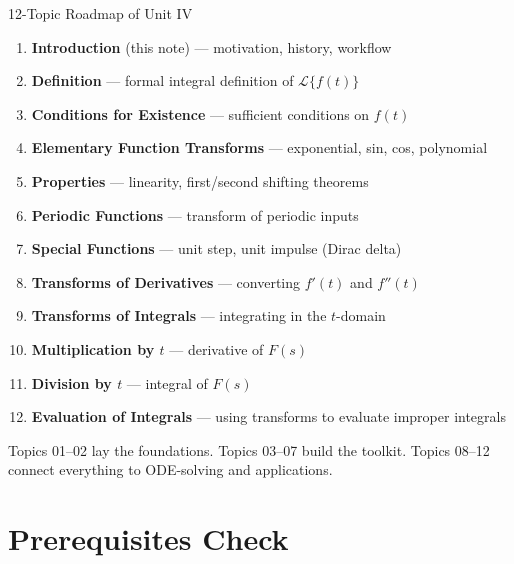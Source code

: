 \documentclass[12pt,a4paper]{article}
\begin{document}
\begin{infobox}{12-Topic Roadmap of Unit IV}
\begin{enumerate}[leftmargin=*, label=\textbf{Topic \arabic*:}]
  \item \textbf{Introduction} (this note) --- motivation, history, workflow
  \item \textbf{Definition} --- formal integral definition of
        $\mathcal{L}\{f(t)\}$
  \item \textbf{Conditions for Existence} --- sufficient conditions on $f(t)$
  \item \textbf{Elementary Function Transforms} --- exponential, sin, cos,
        polynomial
  \item \textbf{Properties} --- linearity, first/second shifting theorems
  \item \textbf{Periodic Functions} --- transform of periodic inputs
  \item \textbf{Special Functions} --- unit step, unit impulse (Dirac delta)
  \item \textbf{Transforms of Derivatives} --- converting $f'(t)$ and $f''(t)$
  \item \textbf{Transforms of Integrals} --- integrating in the $t$-domain
  \item \textbf{Multiplication by $t$} --- derivative of $F(s)$
  \item \textbf{Division by $t$} --- integral of $F(s)$
  \item \textbf{Evaluation of Integrals} --- using transforms to evaluate
        improper integrals
\end{enumerate}

\smallskip
\noindent Topics 01--02 lay the foundations.  Topics 03--07 build the toolkit.
Topics 08--12 connect everything to ODE-solving and applications.
\end{infobox}

\section{Prerequisites Check}
\end{document}
